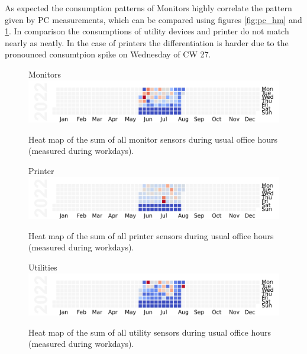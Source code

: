 \noindent As expected the consumption patterns of Monitors highly correlate the pattern given by PC measurements, which can be compared using figures \ref{fig:pc_hm} and \ref{fig:mon_hm}. In comparison the consumptions of utility devices and printer do not match nearly as neatly. In the case of printers the differentiation is harder due to the pronounced consumtpion spike on Wednesday of CW 27.
\begin{figure}[ht]
	\centering
	Monitors
	\includegraphics[width=\textwidth]{images/heatmaps/devicetype_Monitor_workday_cal.png}
	\caption{Heat map of the sum of all monitor sensors during usual office hours (measured during \glspl{workday}).}
	\label{fig:mon_hm}
\end{figure}
\begin{figure}[ht]
	\centering
	Printer
	\includegraphics[width=\textwidth]{images/heatmaps/devicetype_Printer_workday_cal.png}
	\caption{Heat map of the sum of all printer sensors during usual office hours (measured during \glspl{workday}).}
	\label{fig:printer_hm}
\end{figure}

\begin{figure}[ht]
	\centering
	Utilities	\includegraphics[width=\textwidth]{images/heatmaps/devicetype_Utility_workday_cal.png}
	\caption{Heat map of the sum of all utility sensors during usual office hours (measured during \glspl{workday}).}
	\label{fig:util_hm}
\end{figure}

